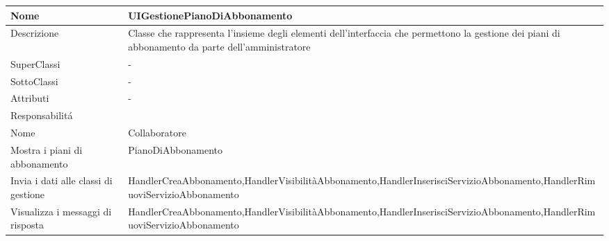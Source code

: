 \begin{center}
    \begin{longtable}{ |p{3cm}|p{3cm}|p{3cm}|p{3cm}| }
        \hline
        Nome & \multicolumn{3}{|p{9cm}|}{UIGestionePianoDiAbbonamento} \\\hline
        Descrizione & \multicolumn{3}{|p{9cm}|}{Classe che rappresenta l'insieme degli elementi dell'interfaccia che permettono la gestione dei piani di abbonamento da parte dell'amministratore} \\\hline
        SuperClassi & \multicolumn{3}{|p{9cm}|}{-} \\\hline
        SottoClassi & \multicolumn{3}{|p{9cm}|}{-} \\\hline
        Attributi & \multicolumn{3}{|p{9cm}|}{-} \\\hline
        \multicolumn{4}{|p{12cm}|}{Responsabilit\'a} \\\hline
        \multicolumn{2}{|p{5cm}|}{Nome} & \multicolumn{2}{|p{7cm}|}{Collaboratore} \\\hline
        \multicolumn{2}{|p{5cm}|}{Mostra i piani di abbonamento} & \multicolumn{2}{|p{7cm}|}{PianoDiAbbonamento} \\\hline
        \multicolumn{2}{|p{5cm}|}{Invia i dati alle classi di gestione} & \multicolumn{2}{|p{7cm}|}{HandlerCreaAbbonamento,\newline  HandlerVisibilitàAbbonamento,\newline   HandlerInserisciServizioAbbonamento,\newline   HandlerRimuoviServizioAbbonamento} \\\hline
        \multicolumn{2}{|p{5cm}|}{Visualizza i messaggi di risposta} & \multicolumn{2}{|p{7cm}|}{HandlerCreaAbbonamento,\newline   HandlerVisibilitàAbbonamento,\newline   HandlerInserisciServizioAbbonamento,\newline   HandlerRimuoviServizioAbbonamento} \\\hline
    \end{longtable}
\end{center}

